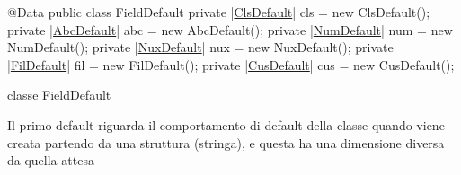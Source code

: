 \documentclass[a4paper,10pt]{report}
\newif\ifesource
\newenvironment{elisting}[1][H]
  {\captionsetup{aboveskip=0pt}\begin{listing}[#1]}
  {\end{listing}%
}
\begin{document}
\ifesource
\begin{figure*}[!htb]
\begin{lstlisting}[language=java, caption=classe FieldDefault, 
label=lst:FieldDefault]
@Data
public class FieldDefault {
    private (*\hyperref[lst:ClsDefault]{ClsDefault}*) cls = new ClsDefault();
    private (*\hyperref[lst:AbcDefault]{AbcDefault}*) abc = new AbcDefault();
    private (*\hyperref[lst:NumDefault]{NumDefault}*) num = new NumDefault();
    private (*\hyperref[lst:NuxDefault]{NuxDefault}*) nux = new NuxDefault();
    private (*\hyperref[lst:FilDefault]{FilDefault}*) fil = new FilDefault();
    private (*\hyperref[lst:CusDefault]{CusDefault}*) cus = new CusDefault();
}
\end{lstlisting}\index{FieldDefault}
\end{figure*}
\else
\begin{elisting}[!htb]
\begin{javacode}
@Data
public class FieldDefault {
    private |\hyperref[lst:ClsDefault]{ClsDefault}| cls = new ClsDefault();
    private |\hyperref[lst:AbcDefault]{AbcDefault}| abc = new AbcDefault();
    private |\hyperref[lst:NumDefault]{NumDefault}| num = new NumDefault();
    private |\hyperref[lst:NuxDefault]{NuxDefault}| nux = new NuxDefault();
    private |\hyperref[lst:FilDefault]{FilDefault}| fil = new FilDefault();
    private |\hyperref[lst:CusDefault]{CusDefault}| cus = new CusDefault();
}
\end{javacode}
\caption{classe FieldDefault}
\label{lst:FieldDefault}
\end{elisting}
\fi
Il primo default riguarda il comportamento di default della classe quando viene 
creata partendo da una struttura (stringa), e questa ha una dimensione diversa 
da quella attesa
\end{document}
